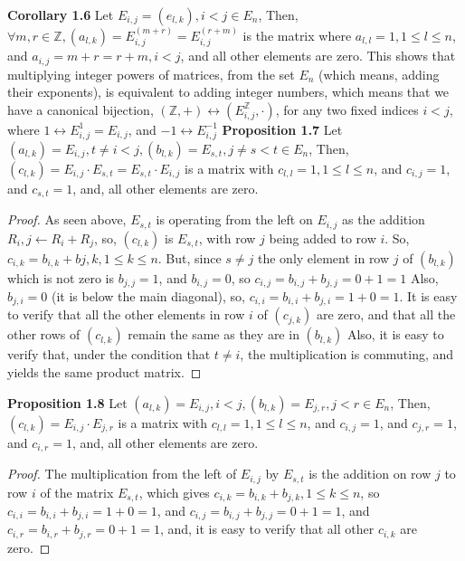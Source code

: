 \documentclass[12pt]{article}
\begin{document}
\textbf{Corollary 1.6} 
Let $E_{i,j}=(e_{l,k}),i<j \in E_n$, Then,\newline
$\forall m,r \in \mathbb{Z},
(a_{l,k})=E_{i,j}^(m+r)=E_{i,j}^(r+m)$ is the matrix where $a_{l,l}=1,1 \leq l \leq n$, and $a_{i,j}=m+r=r+m,i<j$, and all other elements are zero. \newline
This shows that multiplying integer powers of matrices, from the set $E_n$ (which means, adding their exponents), is equivalent to adding integer numbers, which means that we have a canonical bijection, $(\mathbb{Z},+) \leftrightarrow (E_{i,j}^{\mathbb{Z}},\cdot)$, for any two fixed indices $i<j$, where $1 \leftrightarrow E_{i,j}^1=E_{i,j}$, and $-1 \leftrightarrow E_{i,j}^{-1}$ \newline 
\newpage
\textbf{Proposition 1.7} \newline
Let $(a_{l,k})=E_{i,j},t \neq i<j,(b_{l,k})=E_{s,t},j \neq s<t \in E_n$, Then, \newline
$(c_{l,k})=E_{i,j} \cdot E_{s,t}=E_{s,t} \cdot E_{i,j}$ is a matrix with $c_{l,l}=1,1 \leq l \leq n$, and $c_{i,j}=1$, and $c_{s,t}=1$, and, all other elements are zero.
\begin{proof}
As seen above, $E_{s,t}$ is operating from the left on $E_{i,j}$ as the addition $R_i,j \leftarrow R_i+R_j$, so, $(c_{l,k})$ is $E_{s,t}$, with row $j$ being added to row $i$. \newline
So, $c_{i,k}=b_{i,k}+b{j,k},1 \leq k \leq n$. But, since $s \neq j$ the only element in row $j$ of $(b_{l,k})$ which is not zero is $b_{j,j}=1$, and $b_{i,j}=0$, so $c_{i,j}=b_{i,j}+b_{j,j}=0+1=1$ \newline
Also, $b_{j,i}=0$ (it is below the main diagonal), so, $c_{i,i}=b_{i,i}+b_{j,i}=1+0=1$. \newline
It is easy to verify that all the other elements in row $i$ of $(c_{j,k})$ are zero, and that all the other rows of $(c_{l,k})$ remain the same as they are in $(b_{l,k})$ \newline
Also, it is easy to verify that, under the condition that $t \neq i$, the multiplication is commuting, and yields the same product matrix. 
\end{proof}
\textbf{Proposition 1.8} \newline
Let $(a_{l,k})=E_{i,j},i<j,(b_{l,k})=E_{j,r},j<r \in E_n$, Then, \newline
$(c_{l,k})=E_{i,j} \cdot E_{j,r}$ is a matrix with $c_{l,l}=1,1 \leq l \leq n$, and $c_{i,j}=1$, and $c_{j,r}=1$, and $c_{i,r}=1$, and, all other elements are zero.
\begin{proof}
The multiplication from the left of $E_{i,j}$ by $E_{s,t}$ is the addition on row $j$ to row $i$ of the matrix $E_{s,t}$, which gives $c_{i,k}=b_{i,k}+b_{j,k},1 \leq k \leq n$, so $c_{i,i}=b_{i,i}+b_{j,i}=1+0=1$, and $c_{i,j}=b_{i,j}+b_{j,j}=0+1=1$, and $c_{i,r}=b_{i,r}+b_{j,r}=0+1=1$, and, it is easy to verify that all other $c_{i,k}$ are zero. \newline
\end{proof}
\end{document}
